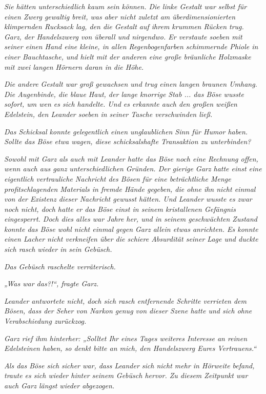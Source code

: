 \textit{Sie hätten unterschiedlich kaum sein können. Die linke Gestalt war selbst für einen Zwerg gewaltig breit, was aber nicht zuletzt am überdimensionierten klimpernden Rucksack lag, den die Gestalt auf ihrem krummen Rücken trug. Garz, der Handelszwerg von überall und nirgendwo. Er verstaute soeben mit seiner einen Hand eine kleine, in allen Regenbogenfarben schimmernde Phiole in einer Bauchtasche, und hielt mit der anderen eine große bräunliche Holzmaske mit zwei langen Hörnern daran in die Höhe.}

\textit{Die andere Gestalt war groß gewachsen und trug einen langen braunen Umhang. Die Augenbinde, die blaue Haut, der lange knorrige Stab ... das Böse wusste sofort, um wen es sich handelte. Und es erkannte auch den großen weißen Edelstein, den Leander soeben in seiner Tasche verschwinden ließ.}

\textit{Das Schicksal konnte gelegentlich einen unglaublichen Sinn für Humor haben. Sollte das Böse etwa wagen, diese schicksalshafte Transaktion zu unterbinden?}

\textit{Sowohl mit Garz als auch mit Leander hatte das Böse noch eine Rechnung offen, wenn auch aus ganz unterschiedlichen Gründen. Der gierige Garz hatte einst eine eigentlich vertrauliche Nachricht des Bösen für eine beträchtliche Menge profitschlagenden Materials in fremde Hände gegeben, die ohne ihn nicht einmal von der Existenz dieser Nachricht gewusst hätten. Und Leander wusste es zwar noch nicht, doch hatte er das Böse einst in seinem kristallenen Gefängnis eingesperrt. Doch dies alles war Jahre her, und in seinem geschwächten Zustand konnte das Böse wohl nicht einmal gegen Garz allein etwas anrichten. Es konnte einen Lacher nicht verkneifen über die schiere Absurdität seiner Lage und duckte sich rasch wieder in sein Gebüsch.}

\textit{Das Gebüsch raschelte verräterisch.}

\textit{„Was war das?!“, fragte Garz.}

\textit{Leander antwortete nicht, doch sich rasch entfernende Schritte verrieten dem Bösen, dass der Seher von Narkon genug von dieser Szene hatte und sich ohne Verabschiedung zurückzog.}

\textit{Garz rief ihm hinterher: „Solltet Ihr eines Tages weiteres Interesse an reinen Edelsteinen haben, so denkt bitte an mich, den Handelszwerg Eures Vertrauens.“}

\textit{Als das Böse sich sicher war, dass Leander sich nicht mehr in Hörweite befand, traute es sich wieder hinter seinem Gebüsch hervor. Zu diesem Zeitpunkt war auch Garz längst wieder abgezogen.}

